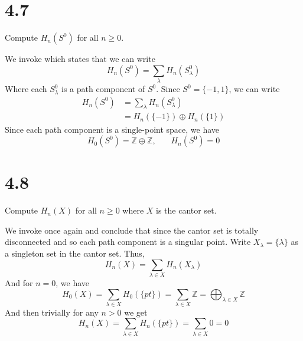 \documentclass{article}
\theoremstyle{definition}
\begin{document}
\section*{4.7}
    \begin{mdframed}[]
        Compute $H_n(S^0)$ for all $n \geq 0$.
    \end{mdframed}
    We invoke  which states that we can write 
    \[
        H_n(S^0) = \sum_\lambda H_n(S^0_\lambda)
    \]
    Where each $S^0_\lambda$ is a path component of $S^0$. Since $S^0 = \{-1,1\}$, we can write
    \begin{align*}
        H_n(S^0) &= \sum_\lambda H_n(S^0_\lambda) \\
        &= H_n(\{-1\}) \oplus H_n(\{1\}) 
    \end{align*}
    Since each path component is a single-point space, we have 
    \[
        H_0(S^0) = \mathbb{Z} \oplus \mathbb{Z}, \ \ \ \ \ \ \ \ H_n(S^0) = 0
    \]
\section*{4.8}
    \begin{mdframed}[]
        Compute $H_n(X)$ for all $n \geq 0$ where $X$ is the cantor set.
    \end{mdframed}
    We invoke  once again and conclude that since the cantor set is totally disconnected
    and so each path component is a singular point. Write $X_\lambda = \{\lambda\}$ as a singleton set 
    in the cantor set. Thus,
    \[
        H_n(X) = \sum_{\lambda \in X} H_n(X_\lambda)
    \]
    And for $n = 0$, we have 
    \[
        H_0(X) = \sum_{\lambda \in X} H_0(\{pt\}) = \sum_{\lambda \in X} \mathbb{Z} = \bigoplus_{\lambda \in X}\mathbb{Z}
    \]
    And then trivially for any $n > 0$ we get 
    \[
        H_n(X) = \sum_{\lambda \in X} H_n(\{pt\}) = \sum_{\lambda \in X} 0 = 0
    \]
\end{document}
